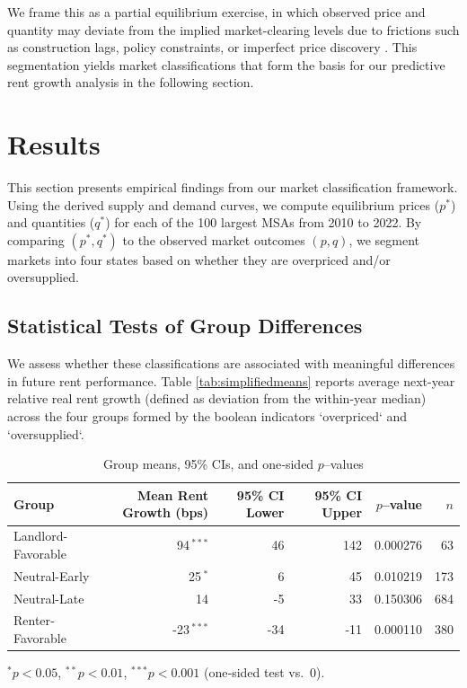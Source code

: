\documentclass[APA,Times1COL]{WileyNJDv5} %
\begin{document}
We frame this as a partial equilibrium exercise, in which observed price and quantity may deviate from the implied market-clearing levels due to frictions such as construction lags, policy constraints, or imperfect price discovery \cite{wheaton1991realestate, glaeser2019rethinking}. This segmentation yields market classifications that form the basis for our predictive rent growth analysis in the following section.

\section{Results}

This section presents empirical findings from our market classification framework. Using the derived supply and demand curves, we compute equilibrium prices (\( p^* \)) and quantities (\( q^* \)) for each of the 100 largest MSAs from 2010 to 2022. By comparing \( (p^*, q^*) \) to the observed market outcomes \( (p, q) \), we segment markets into four states based on whether they are overpriced and/or oversupplied.




\subsection{Statistical Tests of Group Differences}
We assess whether these classifications are associated with meaningful differences in future rent performance. Table \ref{tab:simplifiedmeans} reports average next-year relative real rent growth (defined as deviation from the within-year median) across the four groups formed by the boolean indicators `overpriced` and `oversupplied`.


	
\begin{table}[ht]
	\centering
	\caption{Group means, 95\% CIs, and one‐sided \(p\)–values}
	\label{tab:group_stats}
	\begin{tabular}{lrrrrr}
		\toprule
		Group & Mean Rent Growth (bps) & 95\% CI Lower & 95\% CI Upper & \(p\)–value & \(n\) \\
		\midrule
		Landlord-Favorable  &  94\(\,^{***}\) &   46 & 142 & 0.000276 &  63 \\
		Neutral-Early             &  25\(\,^{*}\)   &    6 &  45 & 0.010219 & 173 \\
		Neutral-Late         &  14             &   -5 &  33 & 0.150306 & 684 \\
		Renter‐Favorable    & -23\(\,^{***}\) &  -34 & -11 & 0.000110 & 380 \\
		\bottomrule
	\end{tabular}
	
	\vspace{0.5ex}
	\footnotesize{\(^{*}p<0.05\), \(^{**}p<0.01\), \(^{***}p<0.001\) (one‐sided test vs.\ 0).}
\end{table}
\end{document}
